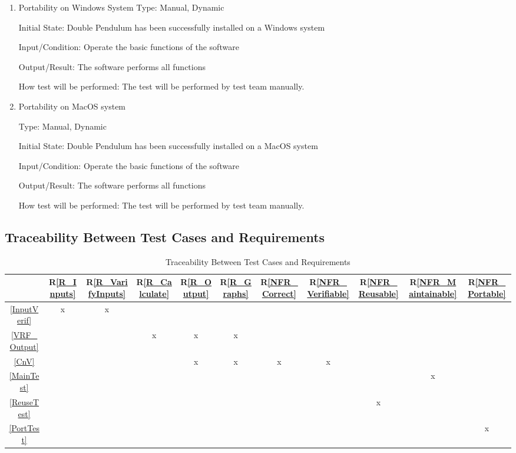 \documentclass[12pt, titlepage]{article}
\newcommand{\rref}[1]{R\ref{#1}}
\begin{document}
\begin{enumerate}
\item{Portability on Windows System} 
Type: Manual, Dynamic

Initial State: Double Pendulum has been successfully installed on a Windows system
          
Input/Condition: Operate the basic functions of the software
          
Output/Result: The software performs all functions 
          
How test will be performed: The test will be performed by test team manually. 

\item{Portability on MacOS system} 

Type: Manual, Dynamic

Initial State: Double Pendulum has been successfully installed on a MacOS system
          
Input/Condition: Operate the basic functions of the software
          
Output/Result: The software performs all functions 
          
How test will be performed: The test will be performed by test team manually. 

\end{enumerate}
\subsection{Traceability Between Test Cases and Requirements}

\begin{table}[H]
\centering
\begin{tabular}{|c|c|c|c|c|c|c|c|c|c|c|}
\hline
  & \rref{R_Inputs}& \rref{R_VarifyInputs} &  \rref{R_Calculate} & \rref{R_Output} & \rref{R_Graphs}& \rref{NFR_Correct}& \rref{NFR_Verifiable} & \rref{NFR_Reusable} & \rref{NFR_Maintainable} & \rref{NFR_Portable}\\
\hline
\ref{InputVerif}      &x&x&&&&&&&&\\ \hline
\ref{VRF_Output}     &&&x&x&x&&&&&\\ \hline
\ref{CnV}      &&&&x&x&x&x&&&\\ \hline
\ref{MainTest}      &&&&&&&& &x&\\ \hline
\ref{ReuseTest}      &&&&&&&&x&&\\ \hline
\ref{PortTest}      &&&&&&&&&&x\\  
\hline
\end{tabular}
\caption{Traceability Between Test Cases and Requirements}
\label{Table:R_trace}

\end{table}
		
\newpage    		




\newpage
\end{document}

